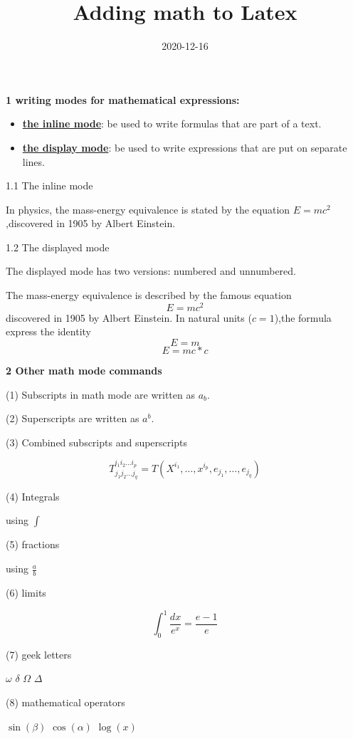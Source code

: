 \documentclass[12pt,A4]{article}
\title{Adding math to Latex}
\date{2020-12-16}
\begin{document}
\textbf{1 writing modes for mathematical expressions:}
\begin{itemize}
    

\item \underline{\textbf{the inline mode}}: be used to write formulas that are part of a text.

\item \underline{\textbf{the display mode}}: be used to write expressions that are put on separate lines.

\end{itemize}

1.1 The inline mode

In physics, the mass-energy equivalence is stated by the equation $E=mc^2$,discovered in 1905 by Albert Einstein.

1.2 The displayed mode

The displayed mode has two versions: numbered and unnumbered.

The mass-energy equivalence is described by the famous equation
\[E=mc^2\]
discovered in 1905 by Albert Einstein. In natural units ($c=1$),the formula express the identity
\begin{equation}
    E=m
\end{equation}
\begin{equation}
    E=mc*c
\end{equation}


\textbf{2 Other math mode commands}

(1) Subscripts in math mode are written as $a_b$.

(2) Superscripts are written as $a^b$.

(3) Combined subscripts and superscripts

\[T^{i_1 i_2 \dots i_p}_{j_1 j_2 \dots j_q}=
T(X^{i_1},\dots,x^{i_p},e_{j_1},\dots,e_{j_q})
\]

(4) Integrals

using $\int$

(5) fractions

using $\frac{a}{b}$

(6) limits

\[\int_0^1 \frac{dx}{e^x}=\frac{e-1}{e} \]

(7) geek letters

$\omega$ $\delta$ $\Omega$ $\Delta$

(8) mathematical operators

$\sin(\beta)$ $\cos(\alpha)$ $\log(x)$


\newpage
\end{document}
